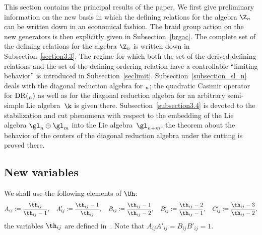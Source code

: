 \documentclass[pdftex]{sigma}
\def\Cprime{C'}\def\ds{\displaystyle}\newcommand{\fracds}[2]{{\ds \frac{#1}{#2}}}
\def\tphi{A}\def\tpsi{A'}\def\tphiplus{B}\def\tpsiminus{B'}\def\ttphi{B}\def\ttpsi{B'}\def\ts{\hskip1pt}\def\tts{\hskip.5pt}
\numberwithin{equation}{section}
\begin{document}
This section contains the principal results of the paper. We f\/irst give
preliminary information on the new basis in which the def\/ining relations for the
algebra $\Z_n$ can be written down in an economical fashion. The braid group action on the new generators is then
explicitly given in Subsection~\ref{brgac}. The complete set of the def\/ining relations for the algebra $\Z_n$ is written down in Subsection~\ref{section3.3}. The regime for which both
the set of the derived def\/ining relations and the set of the def\/ining ordering relation have a controllable ``limiting behavior'' is introduced in Subsection~\ref{seclimit}. Subsection~\ref{subsection_sl_n} deals with the diagonal reduction algebra for $\sl_n$; the quadratic Casimir operator for
${\mathrm{DR}}(\sl_n)$ as well as for the diagonal reduction algebra for an arbitrary semi-simple
Lie algebra~$\k$ is given there. Subsection~\ref{subsection3.4} is devoted to the stabilization and cut phenomena with respect to the embedding of the Lie algebra $\gl_n\oplus\gl_m$ into
the Lie algebra~$\gl_{n+m}$; the theorem about the behavior of the centers of the diagonal reduction algebra under the cutting is proved there.

\subsection{New variables}

We shall use the following elements of $\Uh$:
\begin{gather*}  \tphi_{ij}:=\frac{\th_{ij}}{\th_{ij}-1}  ,\quad \tpsi_{ij}:=\frac{\th_{ij}-1}{\th_{ij}} ,
\quad \ttphi_{ij}:=\frac{\th_{ij}-1}{\th_{ij}-2} ,\quad \ttpsi_{ij}:=\frac{\th_{ij}-2}{\th_{ij}-1} ,\quad \Cprime_{ij}:=\frac{\th_{ij}-3}{\th_{ij}-2},
\end{gather*}
the variables $\th_{ij}$ are def\/ined in~. Note that $\tphi_{ij}\tpsi_{ij}=\ttphi_{ij}\ttpsi_{ij}=1$.
\end{document}
